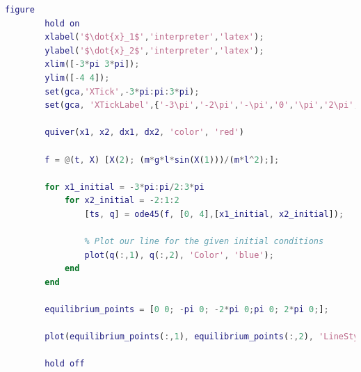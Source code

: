 \documentclass{article}
\begin{document}
\begin{center}
    \begin{lstlisting}[caption={Phase Portrait with Equilibriums MATLAB code},captionpos=b, language=MATLAB]
        figure
        hold on
        xlabel('$\dot{x}_1$','interpreter','latex');
        ylabel('$\dot{x}_2$','interpreter','latex');
        xlim([-3*pi 3*pi]);
        ylim([-4 4]);
        set(gca,'XTick',-3*pi:pi:3*pi);
        set(gca, 'XTickLabel',{'-3\pi','-2\pi','-\pi','0','\pi','2\pi','3\pi'});

        quiver(x1, x2, dx1, dx2, 'color', 'red')

        f = @(t, X) [X(2); (m*g*l*sin(X(1)))/(m*l^2);];

        for x1_initial = -3*pi:pi/2:3*pi
            for x2_initial = -2:1:2
                [ts, q] = ode45(f, [0, 4],[x1_initial, x2_initial]);
                
                % Plot our line for the given initial conditions
                plot(q(:,1), q(:,2), 'Color', 'blue');
            end
        end

        equilibrium_points = [0 0; -pi 0; -2*pi 0;pi 0; 2*pi 0;];

        plot(equilibrium_points(:,1), equilibrium_points(:,2), 'LineStyle',"none", 'Marker',"o", 'MarkerSize', 10, 'MarkerEdgeColor', "green", 'MarkerFaceColor', 'green')

        hold off
    \end{lstlisting}
\end{center}
\end{document}

